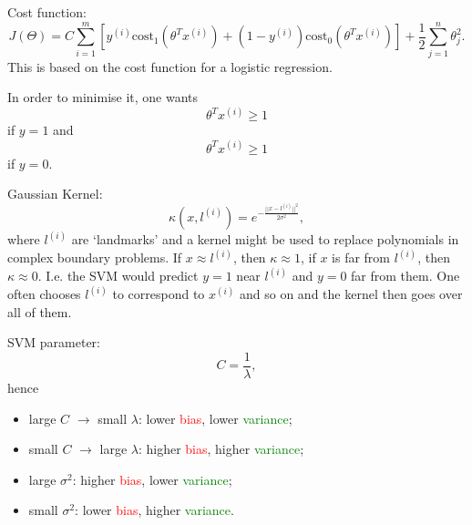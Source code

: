 \documentclass[a4paper,11pt]{article}
\begin{document}
Cost function:
\begin{equation}
J \left( \Theta \right) = C \sum_{i=1} ^m \left[ y^{(i)} \text{cost}_1 \left(\theta^T x^{(i)} \right) + \left(1 - y^{(i)} \right) \text{cost}_0 \left(\theta^T x^{(i)} \right) \right] + \frac{1}{2} \sum_{j=1} ^n \theta_j ^2 .
\end{equation}
This is based on the cost function for a logistic regression.

In order to minimise it, one wants
\begin{equation}
\theta^T x^{(i)} \geq 1
\end{equation}
if \textcolor{OliveGreen}{$y=1$} and
\begin{equation}
\theta^T x^{(i)} \geq 1
\end{equation}
if \textcolor{OliveGreen}{$y=0$}.

Gaussian Kernel:
\begin{equation}
\kappa \left(x, l^{(i)} \right) = e^{-\frac{||x - l^{(i)}||^2}{2 \sigma^2}} ,
\end{equation}
where \textcolor{OliveGreen}{$l^{(i)}$} are `landmarks' and a kernel might be used to replace polynomials in complex boundary problems. If \textcolor{OliveGreen}{$x \approx l^{(i)}$}, then \textcolor{OliveGreen}{$\kappa \approx 1$}, if \textcolor{OliveGreen}{$x$} is far from \textcolor{OliveGreen}{$l^{(i)}$}, then \textcolor{OliveGreen}{$\kappa \approx 0$}. I.e. the SVM would predict \textcolor{OliveGreen}{$y=1$} near \textcolor{OliveGreen}{$l^{(i)}$} and \textcolor{OliveGreen}{$y=0$} far from them. One often chooses \textcolor{OliveGreen}{$l^{(i)}$} to correspond to \textcolor{OliveGreen}{$x^{(i)}$} and so on and the kernel then goes over all of them.

SVM parameter:
\begin{equation}
C = \frac{1}{\lambda} ,
\end{equation}
hence
\begin{itemize}
\item large \textcolor{OliveGreen}{$C$} $\rightarrow$ small \textcolor{OliveGreen}{$\lambda$}: lower \textcolor{Red}{bias}, lower \textcolor{Green}{variance};
\item small \textcolor{OliveGreen}{$C$} $\rightarrow$ large \textcolor{OliveGreen}{$\lambda$}: higher \textcolor{Red}{bias}, higher \textcolor{Green}{variance};
\item large \textcolor{OliveGreen}{$\sigma^2$}: higher \textcolor{Red}{bias}, lower \textcolor{Green}{variance};
\item small \textcolor{OliveGreen}{$\sigma^2$}: lower \textcolor{Red}{bias}, higher \textcolor{Green}{variance}.
\end{itemize}
\end{document}
